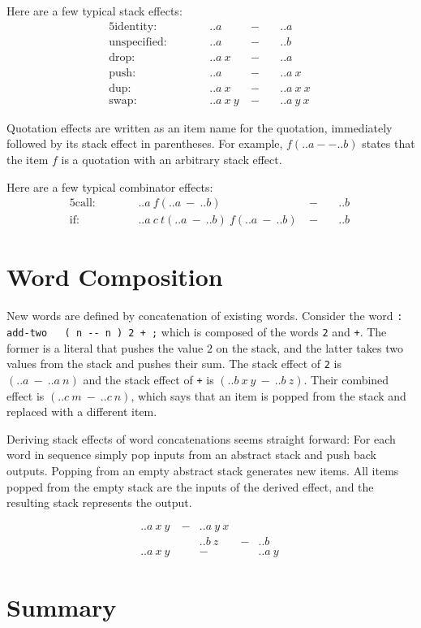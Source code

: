 \documentclass[a4paper]{hitec}
\begin{document}
Here are a few typical stack effects:
\begin{alignat}{5}
	\mathrm{identity:} & \qquad & ..a\ & -\ && ..a\ \\
	\mathrm{unspecified:} & \qquad & ..a\ & -\ && ..b\ \\
	\mathrm{drop:} & \qquad & ..a\ x\ & -\ && ..a\ \\
	\mathrm{push:} & \qquad & ..a\ & -\ && ..a\ x\ \\
	\mathrm{dup:} & \qquad & ..a\ x\ & -\ && ..a\ x\ x\ \\
	\mathrm{swap:} & \qquad & ..a\ x\ y\ & -\ && ..a\ y\ x\
\end{alignat}

Quotation effects are written as an item name for the quotation, immediately
followed by its stack effect in parentheses. For example, $f(..a -- ..b)$
states that the item $f$ is a quotation with an arbitrary stack effect.

Here are a few typical combinator effects:
\begin{alignat}{5}
	\mathrm{call:} & \qquad & ..a\ f(..a\ -\ ..b)\ &-\ && ..b\ \\
	\mathrm{if:} & \qquad & ..a\ c\ t(..a\ -\ ..b)\  f(..a\ -\ ..b)\ &-\ && ..b\
\end{alignat}

\section{Word Composition}

New words are defined by concatenation of existing words. Consider the word
\verb|: add-two   ( n -- n ) 2 + ;| which is composed of the words \verb|2| and
\verb|+|. The former is a literal that pushes the value $2$ on the stack, and
the latter takes two values from the stack and pushes their sum. The stack 
effect of \verb|2| is $(..a\ -\ ..a\ n)$ and the stack effect of \verb|+| is
$(..b\ x\ y\ -\ ..b\ z)$. Their combined effect is $(..c\ m\ -\ ..c\ n)$, which
says that an item is popped from the stack and replaced with a different item.

Deriving stack effects of word concatenations seems straight forward: For each 
word in sequence simply pop inputs from an abstract stack and push back 
outputs. Popping from an empty abstract stack generates new items. All items
popped from the empty stack are the inputs of the derived effect, and the
resulting stack represents the output.

\begin{equation}
\begin{array}{rcrcl}
	..a\ x\ y\ &-& ..a\ y\ x\ & &\\
		       & &    ..b\ z\ &-& ..b\ \\
		  \hline
	..a\ x\ y\ & & -          & & ..a\ y\
\end{array}
\end{equation}

\section{Summary}
\end{document}
